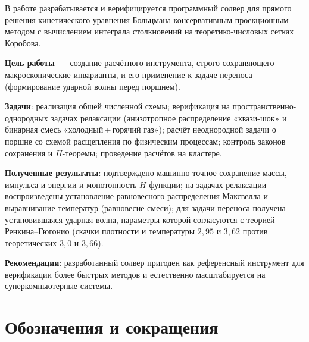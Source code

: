 \documentclass[14pt,a4paper]{extreport}
\numberwithin{equation}{chapter}
\numberwithin{figure}{chapter}
\numberwithin{table}{chapter}
\begin{document}
В работе разрабатывается и верифицируется программный солвер для прямого решения кинетического уравнения Больцмана
консервативным проекционным методом с вычислением интеграла столкновений на теоретико-числовых сетках Коробова.

\textbf{Цель работы}~--- создание расчётного инструмента, строго сохраняющего макроскопические инварианты, и его
применение к задаче переноса (формирование ударной волны перед поршнем).

\textbf{Задачи}: реализация общей численной схемы; верификация на пространственно-однородных задачах релаксации
(анизотропное распределение «квази-шок» и бинарная смесь «холодный\,+\,горячий газ»); расчёт неоднородной задачи о
поршне со схемой расщепления по физическим процессам; контроль законов сохранения и $H$-теоремы; проведение расчётов на
кластере.

\textbf{Полученные результаты}: подтверждено машинно-точное сохранение массы, импульса и энергии и монотонность
$H$-функции; на задачах релаксации воспроизведены установление равновесного распределения Максвелла и выравнивание
температур (равновесие смеси); для задачи переноса получена установившаяся ударная волна, параметры которой согласуются
с теорией Ренкина--Гюгонио (скачки плотности и температуры $2{,}95$ и $3{,}62$ против теоретических $3{,}0$ и $3{,}66$).

\textbf{Рекомендации}: разработанный солвер пригоден как референсный инструмент для верификации более быстрых методов и
естественно масштабируется на суперкомпьютерные системы.



\tableofcontents

\chapter*{Обозначения и сокращения}
\end{document}
